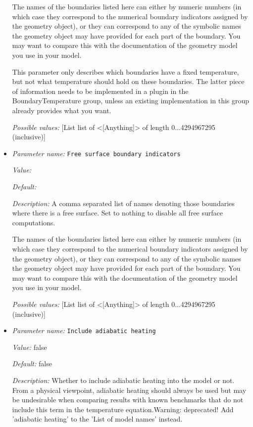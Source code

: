 \begin{itemize}
The names of the boundaries listed here can either by numeric numbers (in which case they correspond to the numerical boundary indicators assigned by the geometry object), or they can correspond to any of the symbolic names the geometry object may have provided for each part of the boundary. You may want to compare this with the documentation of the geometry model you use in your model.

This parameter only describes which boundaries have a fixed temperature, but not what temperature should hold on these boundaries. The latter piece of information needs to be implemented in a plugin in the BoundaryTemperature group, unless an existing implementation in this group already provides what you want.


{\it Possible values:} [List list of <[Anything]> of length 0...4294967295 (inclusive)]
\item {\it Parameter name:} {\tt Free surface boundary indicators}
\label{parameters:Model settings/Free surface boundary indicators}


{\it Value:} 


{\it Default:} 


{\it Description:} A comma separated list of names denoting those boundaries where there is a free surface. Set to nothing to disable all free surface computations.

The names of the boundaries listed here can either by numeric numbers (in which case they correspond to the numerical boundary indicators assigned by the geometry object), or they can correspond to any of the symbolic names the geometry object may have provided for each part of the boundary. You may want to compare this with the documentation of the geometry model you use in your model.


{\it Possible values:} [List list of <[Anything]> of length 0...4294967295 (inclusive)]
\item {\it Parameter name:} {\tt Include adiabatic heating}
\label{parameters:Model settings/Include adiabatic heating}


{\it Value:} false


{\it Default:} false


{\it Description:} Whether to include adiabatic heating into the model or not. From a physical viewpoint, adiabatic heating should always be used but may be undesirable when comparing results with known benchmarks that do not include this term in the temperature equation.Warning: deprecated! Add 'adiabatic heating' to the 'List of model names' instead.



\end{itemize}

